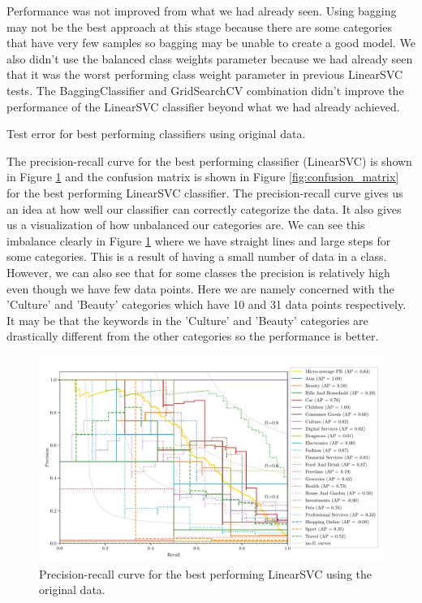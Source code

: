 Performance was not improved from what we had already seen. Using bagging may not be the best approach at this stage because there are some categories that have very few samples so bagging may be unable to create a good model. We also didn't use the balanced class weights parameter because we had already seen that it was the worst performing class weight parameter in previous LinearSVC tests. The BaggingClassifier and GridSearchCV combination didn't improve the performance of the LinearSVC classifier beyond what we had already achieved.

\begin{table}[ht]
\centering
\caption{Test error for best performing classifiers using original data.}

\label{tab:best_errors}
\end{table}

The precision-recall curve for the best performing classifier (LinearSVC) is shown in Figure \ref{fig:pr_curve} and the confusion matrix is shown in Figure \ref{fig:confusion_matrix} for the best performing LinearSVC classifier. The precision-recall curve gives us an idea at how well our classifier can correctly categorize the data. It also gives us a visualization of how unbalanced our categories are. We can see this imbalance clearly in Figure \ref{fig:pr_curve} where we have straight lines and large steps for some categories. This is a result of having a small number of data in a class. However, we can also see that for some classes the precision is relatively high even though we have few data points. Here we are namely concerned with the 'Culture' and 'Beauty' categories which have 10 and 31 data points respectively. It may be that the keywords in the 'Culture' and 'Beauty' categories are drastically different from the other categories so the performance is better. 

\begin{figure}[ht]
  \centering
  \includegraphics[width=\textwidth]{../img/plot_pr_curve}
  \caption{Precision-recall curve for the best performing LinearSVC using the original data.}
  \label{fig:pr_curve}
\end{figure}

